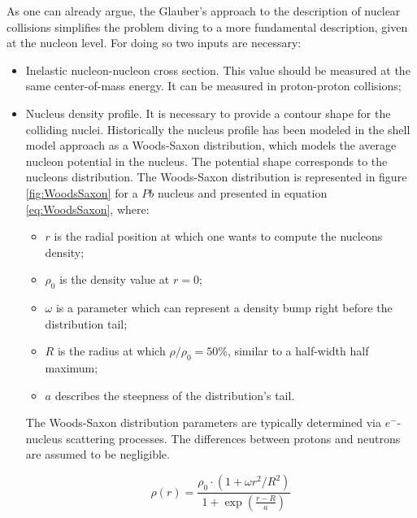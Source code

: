 As one can already argue, the Glauber's approach to the description of nuclear collisions simplifies the problem diving to a more fundamental description, given at the nucleon level.
For doing so two inputs are necessary:
\begin{itemize}
\item Inelastic nucleon-nucleon cross section. 
This value should be measured at the same center-of-mass energy. 
It can be measured in proton-proton collisions;
\item Nucleus density profile. It is necessary to provide a contour shape for the colliding nuclei. 
Historically the nucleus profile has been modeled in the shell model approach as a Woods-Saxon distribution, which models the average nucleon potential in the nucleus. 
The potential shape corresponds to the nucleons distribution.
The Woods-Saxon distribution is represented in figure \ref{fig:WoodsSaxon} for a $Pb$ nucleus and presented in equation \ref{eq:WoodsSaxon}, where:
\begin{itemize}
\item $r$ is the radial position at which one wants to compute the nucleons density;
\item $\rho_0$ is the density value at $r=0$;
\item $\omega$ is a parameter which can represent a density bump right before the distribution tail;
\item $R$ is the radius at which $\rho/\rho_0=50\%$, similar to a half-width half maximum;
\item $a$ describes the steepness of the distribution's tail.
\end{itemize}
The Woods-Saxon distribution parameters are typically determined via $e^-$-nucleus scattering processes.
The differences between protons and neutrons are assumed to be negligible.

\begin{equation}
\label{eq:WoodsSaxon}
\rho(r) = \frac{\rho_0\cdot(1+\omega r^2/R^2)}{1+\exp(\frac{r-R}{a})}
\end{equation}

\end{itemize}

